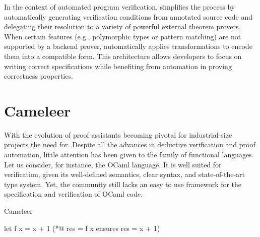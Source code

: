 In the context of automated program verification, \whythree simplifies the process by automatically generating verification 
conditions from annotated source code and delegating their resolution to a variety of powerful external theorem provers. 
When certain features (e.g., polymorphic types or pattern matching) are not supported by a backend prover, \whythree automatically 
applies transformations to encode them into a compatible form. This architecture allows developers to focus on writing 
correct specifications while benefiting from automation in proving correctness properties.~\cite{boogie11why3}

\section{Cameleer}
\label{sec:Cameleer}

With the evolution of proof assistants becoming pivotal for industrial-size projects the need for. Despite all the advances in 
deductive verification and proof automation, little attention has been given to the family of functional languages. Let us
consider, for instance, the OCaml language. It is well suited for verification, given its well-defined semantics, clear syntax, 
and state-of-the-art type system. Yet, the community still lacks an easy to use framework for the specification and
verification of OCaml code.

Cameleer ~\cite{PereiraR20}

\begin{gospell}
  let f x = x + 1 (*@ res = f x ensures res = x + 1)
\end{gospell}